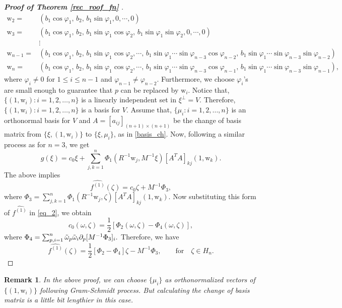 \documentclass[11pt,a4paper,reqno]{amsart}
\newtheorem{remark}[definition]{Remark}
\newcommand{\w}{\mathrm{w}}
\begin{document}
\begin{proof}[\textbf{Proof of Theorem \ref{rec_roof_fn}
}]
\begin{equation}
\begin{aligned}
\w_{2}=&(b_1\cos\varphi_{1},\,b_2,\,b_1\sin\varphi_{1},0,\cdots,0)\\
\w_{3}=& (b_1\cos\varphi_{1},\,b_2,\,b_1\sin\varphi_{1}\cos \varphi_{2},\, b_1\sin\varphi_{1}\sin \varphi_{2},0,\cdots,0)\\
&\vdots\\
\w_{n-1}=& (b_1\cos\varphi_{1},\,b_2,\,b_1\sin\varphi_{1}\cos \varphi_{2},\cdots,\, b_1\sin\varphi_{1}\cdots\sin \varphi_{n-3}\cos \varphi_{n-2},\, b_1\sin\varphi_{1}\cdots\sin \varphi_{n-3}\sin \varphi_{n-2})\\
\w_{n}=& (b_1\cos\varphi_{1},\,b_2,\,b_1\sin\varphi_{1}\cos \varphi_{2},\cdots,\, b_1\sin\varphi_{1}\cdots\sin \varphi_{n-3}\cos \varphi_{n-1},\, b_1\sin\varphi_{1}\cdots\sin \varphi_{n-3}\sin \varphi_{n-1}),
\end{aligned}
\end{equation}
where $\varphi_{i} \neq 0$ for $1\leq i \leq n-1$ and $\varphi_{n-1} \neq \varphi_{n-2}$.
Furthermore, we choose $\varphi_{i}$'s are  small enough to guarantee that $p$ can be replaced by $\w_i$. Notice that, $\{(1,\w_i):i=1,2,\dots,n\}$ is a linearly independent set in $\xi^{\perp}=V$. Therefore, $\{(1,\w_i):i=1,2,\dots,n\}$ is a basis for $V$. Assume that, $\{\mu_{i}:i=1,2,\dots,n\}$ is an orthonormal basis for $V$ and $A=[a_{ij}]_{(n+1)\times (n+1)}$ be the change of basis matrix from $\{\xi,(1,\w_{i})\}$ to $\{\xi,\mu_{i}\}$, as in \eqref{basis_ch}.
        Now, following a similar process as for $n=3$, we get 
		\[
		g(\xi)=c_0 \xi +\sum_{j,k=1}^{n}\Phi_{1}(R^{-1}\w_{j},M^{-1}\xi)[A^{T}A]_{kj}(1,\w_k).
		\]
		The above implies 
		\[
		\widehat{f^{(1)}}(\zeta)=c_0\zeta+M^{-1}\Phi_3,
		\]
		where $\Phi_3=\sum_{j,k=1}^{n}\Phi_{1}(R^{-1}\w_{j},\zeta)[A^{T}A]_{kj}(1,\w_k)$. Now substituting this form of $\widehat{f^{(1)}}$ in \eqref{eq_2}, we obtain
		\[
		c_0(\omega,\zeta)=\frac{1}{2}[\Phi_2(\omega,\zeta)-\Phi_4(\omega,\zeta)],
		\] where $\Phi_4=\sum_{p,i=1}^{n}\Tilde{\omega}_{p}\Tilde{\omega}_{i}\partial_{p}[M^{-1}\Phi_3]_i.$
		Therefore, we have 
		\[
		\widehat{f^{(1)}}(\zeta)=\frac{1}{2}[\Phi_2-\Phi_4]\zeta - M^{-1}\Phi_3, \qquad \mbox{for}\quad \zeta \in H_n.
		\]
	\end{proof}
	\begin{remark}
		In the above proof, we can choose $\{\mu_i\}$ as orthonormalized vectors of $\{(1,\w_i)\}$ following Gram-Schmidt process. But calculating the change of basis matrix is a little bit lengthier in this case.
	\end{remark}
	
\end{document}
